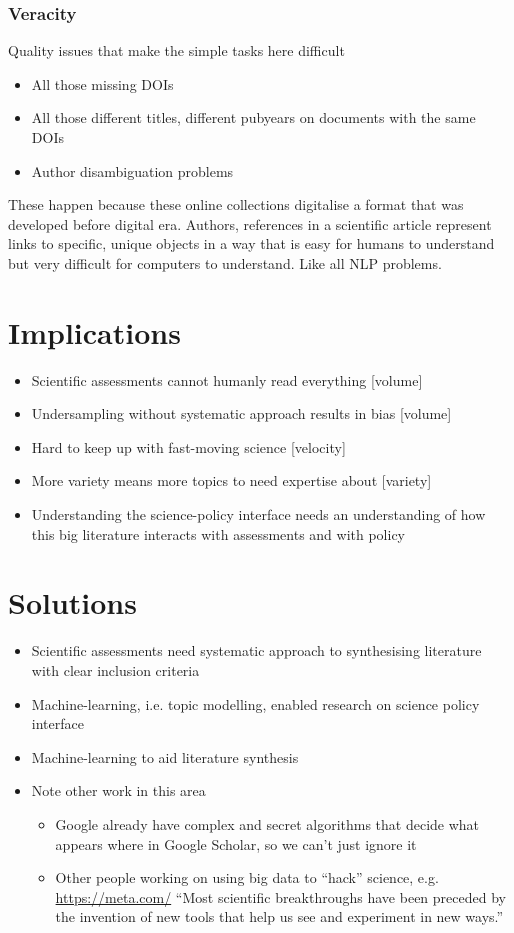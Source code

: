 \documentclass{article}
\begin{document}
\subsubsection*{Veracity}
Quality issues that make the simple tasks here difficult
\begin{itemize}
	\item All those missing DOIs
    \item All those different titles, different pubyears on documents with the same DOIs
    \item Author disambiguation problems
\end{itemize}
These happen because these online collections digitalise a format that was developed before digital era. Authors, references in a scientific article represent links to specific, unique objects in a way that is easy for humans to understand but very difficult for computers to understand. Like all NLP problems.

\section{Implications}
\begin{itemize}
	\item Scientific assessments cannot humanly read everything [volume]
    \item Undersampling without systematic approach results in bias [volume]
    \item Hard to keep up with fast-moving science [velocity]
    \item More variety means more topics to need expertise about [variety]
    \item Understanding the science-policy interface needs an understanding of how this big literature interacts with assessments and with policy
\end{itemize}

\section{Solutions}

\begin{itemize}
	\item Scientific assessments need systematic approach to synthesising literature with clear inclusion criteria
    \item Machine-learning, i.e. topic modelling, enabled research on science policy interface
    \item Machine-learning to aid literature synthesis
    \item Note other work in this area
    \begin{itemize}
    	\item Google already have complex and secret algorithms that decide what appears where in Google Scholar, so we can't just ignore it
        \item Other people working on using big data to ``hack'' science, e.g. \url{https://meta.com/} ``Most scientific breakthroughs have been preceded by the invention of new tools that help us see and experiment in new ways.''
    \end{itemize}
\end{itemize}


\listoffigures




\end{document}
